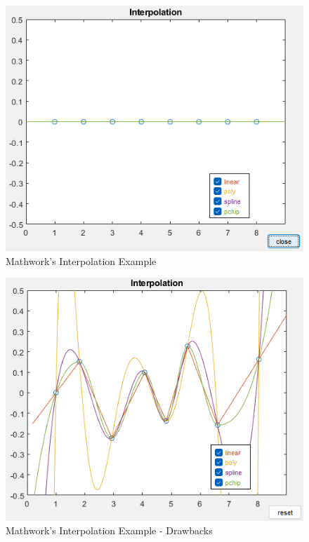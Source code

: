 \begin{figure}[H]
    \centering
    \includegraphics[scale=0.6]{Include/Images/Thesis/Development/Visualizers/INTERPOLATION VISUALIZER/Mathworks.Interpolation.Ex1.png}
    \caption{Mathwork's Interpolation Example}
    \label{fig:Mathworks Interpolation Example}
\end{figure}
\begin{figure}[H]
    \centering
    \includegraphics[scale=0.6]{Include/Images/Thesis/Development/Visualizers/INTERPOLATION VISUALIZER/Mathworks.Interpolation.Ex1.1.png}
    \caption{Mathwork's Interpolation Example - Drawbacks}
    \label{fig:Mathwork's Interpolation Example - Drawbacks}
\end{figure}


